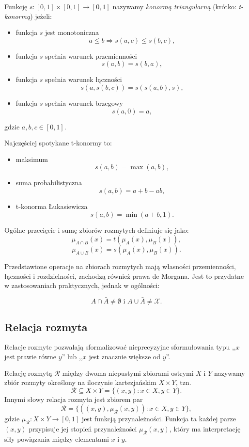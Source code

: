 \begin{definition}[t-konorma]
Funkcję $s : [0,1] \times [0,1] \rightarrow [0,1]$ nazywamy \emph{konormą
triangularną} (krótko: \emph{t-konormą}) jeżeli:
\begin{itemize}
  \item funkcja $s$ jest monotoniczna $$a \leq b \Rightarrow s(a,c) \leq
  s(b,c),$$
  \item funkcja $s$ spełnia warunek przemienności $$s(a,b) = s(b,a),$$
  \item funkcja $s$ spełnia warunek łączności $$s(a, s(b,c)) = s(s(a,b),s),$$
  \item funkcja $s$ spełnia warunek brzegowy $$s(a,0)=a,$$
\end{itemize}
gdzie $a, b, c \in [0,1]$.
\end{definition}

Najczęściej spotykane t-konormy to:
\begin{itemize}
  \item maksimum $$s(a,b) = \max(a,b),$$
  \item suma probabilistyczna $$s(a,b) = a+b-ab,$$
  \item t-konorma Łukasiewicza $$s(a,b) = \min(a+b,1).$$
\end{itemize}

Ogólne przecięcie i sumę zbiorów rozmytych definiuje się jako:
$$\mu_{A \cap B}(x) = t(\mu_A(x), \mu_B(x)), $$
$$\mu_{A \cup B}(x) = s(\mu_A(x), \mu_B(x)). $$

Przedstawione operacje na zbiorach rozmytych mają własności przemienności,
łączności i rozdzielności, zachodzą również prawa de Morgana. Jest to przydatne
w zastosowaniach praktycznych, jednak w ogólności:

$$A \cap \bar{A} \neq \emptyset \textrm{ i } A \cup \bar{A} \neq \mathcal{X}.$$

\subsection{Relacja rozmyta}
Relacje rozmyte pozwalają sformalizować nieprecyzyjne sformułowania typu ,,$x$
jest prawie równe $y$'' lub ,,$x$ jest znacznie większe od $y$''.

\begin{definition}
Relację rozmytą $\mathcal{R}$ między dwoma niepustymi zbiorami ostrymi $X$ i $Y$
nazywamy zbiór rozmyty określony na iloczynie kartezjańskim $X \times Y$, tzn.
$$\mathcal{R} \subseteq X \times Y = \{ (x,y) : x \in X, y \in Y \}.$$
Innymi słowy relacja rozmyta jest zbiorem par
\begin{equation}
\mathcal{R} = \{ ((x,y), \mu_{\mathcal{R}}(x,y)) : x \in X, y \in Y \},
\end{equation}
gdzie $\mu_{\mathcal{R}} : X \times Y \rightarrow [0,1]$ jest funkcją
przynależności. Funkcja ta każdej parze $(x,y)$ przypisuje jej stopień
przynależności $\mu_{\mathcal{R}}(x,y)$, który ma interpretację siły powiązania
między elementami $x$ i $y$.
\end{definition}

